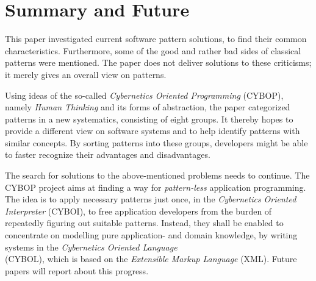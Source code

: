 %
%
%
%
%
%
%

\section{Summary and Future}
\label{summary_heading}

This paper investigated current software pattern solutions, to find their
common characteristics. Furthermore, some of the good and rather bad sides of
classical patterns were mentioned. The paper does not deliver solutions to
these criticisms; it merely gives an overall view on patterns.

Using ideas of the so-called \emph{Cybernetics Oriented Programming} (CYBOP),
namely \emph{Human Thinking} and its forms of abstraction, the paper categorized
patterns in a new systematics, consisting of eight groups. It thereby hopes to
provide a different view on software systems and to help identify patterns with
similar concepts. By sorting patterns into these groups, developers might be
able to faster recognize their advantages and disadvantages.

The search for solutions to the above-mentioned problems needs to continue. The
CYBOP project \cite{cybop} aims at finding a way for \emph{pattern-less}
application programming. The idea is to apply necessary patterns just once, in
the \emph{Cybernetics Oriented Interpreter} (CYBOI), to free application
developers from the burden of repeatedly figuring out suitable patterns.
Instead, they shall be enabled to concentrate on modelling pure application- and
domain knowledge, by writing systems in the \emph{Cybernetics Oriented Language}\\
(CYBOL), which is based on the \emph{Extensible Markup Language} (XML). Future
papers will report about this progress.

